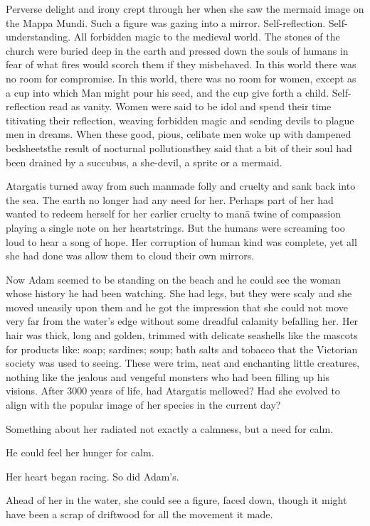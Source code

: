 Perverse delight and irony crept through her when she saw the mermaid
image on the Mappa Mundi. Such a figure was gazing into a
mirror. Self-reflection. Self-understanding. All forbidden magic to
the medieval world. The stones of the church were buried deep in the
earth and pressed down the souls of humans in fear of what fires would
scorch them if they misbehaved. In this world there was no room for
compromise. In this world, there was no room for women, except as a
cup into which Man might pour his seed, and the cup give forth a
child. Self-reflection read as vanity. Women were said to be idol and
spend their time titivating their reflection, weaving forbidden magic
and sending devils to plague men in dreams. When these good, pious,
celibate men woke up with dampened bedsheets\=the result of nocturnal
pollutions\=they said that a bit of their soul had been drained by a
succubus, a she-devil, a sprite or a mermaid.

Atargatis turned away from such manmade folly and cruelty and sank
back into the sea. The earth no longer had any need for her. Perhaps
part of her had wanted to redeem herself for her earlier cruelty to
man\=a twine of compassion playing a single note on her
heartstrings. But the humans were screaming too loud to hear a song of
hope. Her corruption of human kind was complete, yet all she had done
was allow them to cloud their own mirrors.

\fugue

Now Adam seemed to be standing on the beach and he could see the woman
whose history he had been watching. She had legs, but they were scaly
and she moved uneasily upon them and he got the impression that she
could not move very far from the water’s edge without some dreadful
calamity befalling her. Her hair was thick, long and golden, trimmed
with delicate seashells like the mascots for products like: soap;
sardines; soup; bath salts and tobacco that the Victorian society was
used to seeing. These were trim, neat and enchanting little creatures,
nothing like the jealous and vengeful monsters who had been filling up
his visions. After 3000 years of life, had Atargatis mellowed? Had she
evolved to align with the popular image of her species in the current
day?

Something about her radiated not exactly a calmness, but a need for
calm.

He could feel her hunger for calm.

Her heart began racing. So did Adam’s.

Ahead of her in the water, she could see a figure, faced down, though
it might have been a scrap of driftwood for all the movement it made.

